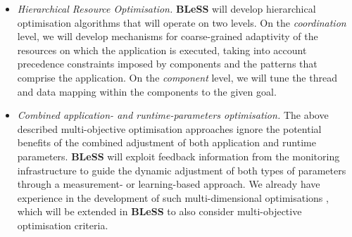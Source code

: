 \documentclass[a4paper,11pt]{article}
\newcommand{\project}[1]{\textbf{#1}\xspace}
\newcommand{\BLESS}{\project{BLeSS}}
\newcommand{\TheProject}{\BLESS}
\begin{document}
\begin{itemize}
\item \emph{Hierarchical Resource Optimisation.} 
\TheProject will develop hierarchical optimisation algorithms that will operate on two levels. On the \emph{coordination} level, we will develop mechanisms for coarse-grained adaptivity of the resources on which the application is executed, taking into account precedence constraints imposed by components and the patterns that comprise the application. On the \emph{component} level, we will tune the thread and data mapping within the components to the given goal.


\item \emph{Combined application- and runtime-parameters optimisation.} 
\textbf{}The above described multi-objective optimisation approaches ignore the potential benefits of the combined adjustment of both application and runtime parameters. 
\TheProject will exploit feedback information from the monitoring 
infrastructure to guide the dynamic adjustment of both types of parameters 
through a measurement- or learning-based approach. We
already have experience in the development of such multi-dimensional optimisations 
\cite{chasparis_design_2016,chasparis_reinforcement-learning-based_2015},
which will be extended in \TheProject{} to also consider multi-objective 
optimisation criteria.



\end{itemize}
\end{document}

